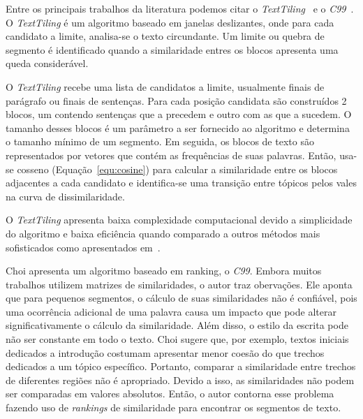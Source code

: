 Entre os principais trabalhos da literatura podemos citar o  \textit{TextTiling}~\cite{Hearst1994} e o \textit{C99}~\cite{Choi2000}.
%
O \textit{TextTiling} é um algoritmo baseado em janelas deslizantes, onde para cada candidato a limite, analisa-se o texto circundante. Um limite ou quebra de segmento é identificado quando a similaridade entres os blocos apresenta uma queda considerável.


O \textit{TextTiling} recebe uma lista de candidatos a limite, usualmente finais de parágrafo ou finais de sentenças. Para cada posição candidata são construídos 2 blocos, um contendo sentenças que a precedem e outro com as que a sucedem. O tamanho desses blocos é um parâmetro a ser fornecido ao algoritmo e determina o tamanho mínimo de um segmento.
%
Em seguida, os blocos de texto são representados por vetores que contém as frequências de suas palavras. Então, usa-se cosseno (Equação~\ref{equ:cosine}) para calcular a similaridade entre os blocos adjacentes a cada candidato e identifica-se uma transição entre tópicos pelos vales na curva de dissimilaridade.



O \textit{TextTiling} apresenta baixa complexidade computacional devido a simplicidade do algoritmo e baixa eficiência quando comparado a outros métodos mais sofisticados como apresentados em~\cite{Choi2000, Kern2009, Misra2009}.




Choi \cite{Choi2000} apresenta um algoritmo baseado em ranking, o \textit{C99}. 
%
Embora muitos trabalhos utilizem matrizes de similaridades, o autor traz obervações.
%
Ele aponta que para pequenos segmentos, o cálculo de suas similaridades não é confiável, pois uma ocorrência adicional de uma palavra causa um impacto que pode alterar significativamente o cálculo da similaridade.
%
Além disso, o estilo da escrita pode não ser constante em todo o texto. Choi sugere que, por exemplo, textos iniciais dedicados a introdução costumam apresentar menor coesão do que trechos dedicados a um tópico específico. Portanto, comparar a similaridade entre trechos de diferentes regiões não é apropriado.
Devido a isso, as similaridades não podem ser comparadas em valores absolutos. Então, o autor contorna esse problema fazendo uso de \textit{rankings} de similaridade para encontrar os segmentos de texto. 

